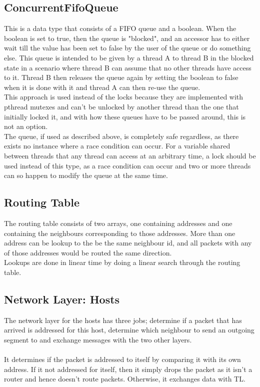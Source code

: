 \subsection{ConcurrentFifoQueue}
This is a data type that consists of a FIFO queue and a boolean. When the boolean is set to true, then the queue is "blocked", and an accessor has to either wait till the value has been set to false by the user of the queue or do something else. This queue is intended to be given by a thread A to thread B in the blocked state in a scenario where thread B can assume that no other threads have access to it. Thread B then releases the queue again by setting the boolean to false when it is done with it and thread A can then re-use the queue.\\
This approach is used instead of the locks because they are implemented with pthread mutexes and can't be unlocked by another thread than the one that initially locked it, and with how these queues have to be passed around, this is not an option.\\
The queue, if used as described above, is completely safe regardless, as there exists no instance where a race condition can occur. For a variable shared between threads that any thread can access at an arbitrary time, a lock should be used instead of this type, as a race condition can occur and two or more threads can so happen to modify the queue at the same time.

\subsection{Routing Table}
The routing table consists of two arrays, one containing addresses and one containing the neighbours corresponding to those addresses. More than one address can be lookup to the be the same neighbour id, and all packets with any of those addresses would be routed the same direction.\\
Lookups are done in linear time by doing a linear search through the routing table.

\subsection{Network Layer: Hosts}
\label{sec:NLHosts}
The network layer for the hosts has three jobs; determine if a packet that has arrived is addressed for this host, determine which neighbour to send an outgoing segment to and exchange messages with the two other layers.\\
\\
It determines if the packet is addressed to itself by comparing it with its own address. If it not addressed for itself, then it simply drops the packet as it isn't a router and hence doesn't route packets. Otherwise, it exchanges data with TL.\\

